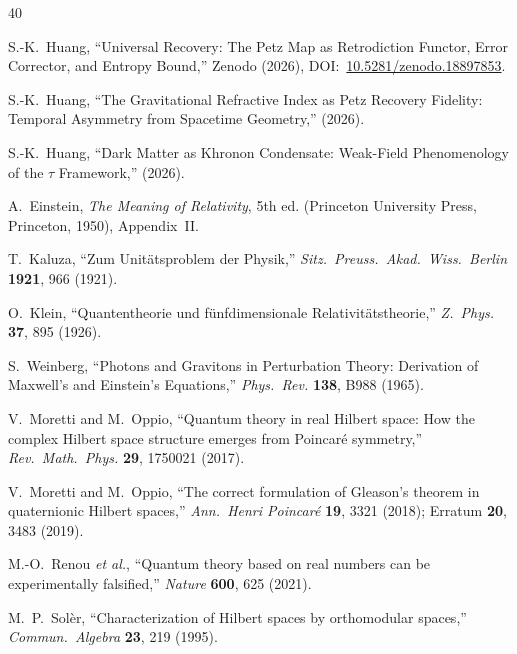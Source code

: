 \documentclass[prl,twocolumn,superscriptaddress,longbibliography]{revtex4-2}
\begin{document}
\begin{thebibliography}{40}


S.-K.~Huang,
``Universal Recovery: The Petz Map as Retrodiction Functor,
Error Corrector, and Entropy Bound,''
Zenodo (2026), DOI:~\href{https://doi.org/10.5281/zenodo.18897853}{10.5281/zenodo.18897853}.

S.-K.~Huang,
``The Gravitational Refractive Index as Petz Recovery Fidelity:
Temporal Asymmetry from Spacetime Geometry,''
(2026).

S.-K.~Huang,
``Dark Matter as Khronon Condensate: Weak-Field Phenomenology
of the $\tau$ Framework,''
(2026).


A.~Einstein,
\textit{The Meaning of Relativity}, 5th ed.
(Princeton University Press, Princeton, 1950), Appendix~II.

T.~Kaluza,
``Zum Unit\"{a}tsproblem der Physik,''
\textit{Sitz.\ Preuss.\ Akad.\ Wiss.\ Berlin} \textbf{1921}, 966 (1921).

O.~Klein,
``Quantentheorie und f\"{u}nfdimensionale Relativit\"{a}tstheorie,''
\textit{Z.\ Phys.} \textbf{37}, 895 (1926).

S.~Weinberg,
``Photons and Gravitons in Perturbation Theory: Derivation of
Maxwell's and Einstein's Equations,''
\textit{Phys.\ Rev.} \textbf{138}, B988 (1965).


V.~Moretti and M.~Oppio,
``Quantum theory in real Hilbert space: How the complex Hilbert
space structure emerges from Poincar\'{e} symmetry,''
\textit{Rev.\ Math.\ Phys.} \textbf{29}, 1750021 (2017).

V.~Moretti and M.~Oppio,
``The correct formulation of Gleason's theorem in quaternionic
Hilbert spaces,''
\textit{Ann.\ Henri Poincar\'{e}} \textbf{19}, 3321 (2018);
Erratum \textbf{20}, 3483 (2019).

M.-O.~Renou \textit{et al.},
``Quantum theory based on real numbers can be experimentally
falsified,''
\textit{Nature} \textbf{600}, 625 (2021).

M.~P.~Sol\`{e}r,
``Characterization of Hilbert spaces by orthomodular spaces,''
\textit{Commun.\ Algebra} \textbf{23}, 219 (1995).


\end{thebibliography}
\end{document}

